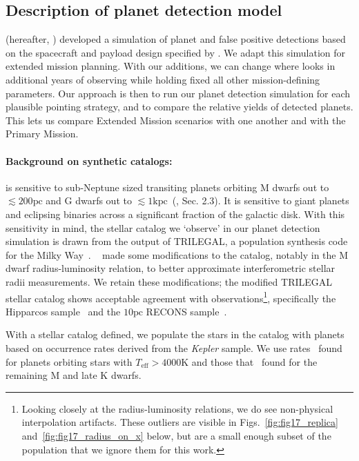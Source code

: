\subsection{Description of planet detection model}
\label{sec:planet_detection_model}

\citet{Sullivan_2015} (hereafter, )
developed a simulation of \tesss planet and false positive detections
based on the spacecraft and payload design specified by
\citet{ricker_transiting_2014}.  We adapt this simulation for extended
mission planning.  With our additions, we can change where \tess looks
in additional years of observing while holding fixed all other
mission-defining parameters.  Our approach is then to run our planet
detection simulation for each plausible pointing strategy, and to
compare the relative yields of detected planets.  This lets us compare
Extended Mission scenarios with one another and with the Primary
Mission.

\paragraph{Background on synthetic catalogs:}

\tess is sensitive to sub-Neptune sized transiting planets orbiting M
dwarfs out to $\lesssim200\text{pc}$ and G dwarfs out to
$\lesssim1\text{kpc}$~(, Sec. 2.3).  It is
sensitive to giant planets and eclipsing binaries across a significant
fraction of the galactic disk.  With this sensitivity in mind, the
stellar catalog we `observe' in our planet detection simulation is
drawn from the output of TRILEGAL, a population synthesis code for the
Milky Way~\citep{girardi_star_2005}.  ~ made
some modifications to the catalog, notably in the M dwarf
radius-luminosity relation, to better approximate interferometric
stellar radii measurements.  We retain these modifications; the modified
TRILEGAL stellar catalog shows acceptable agreement with
observations\footnote{Looking closely at the radius-luminosity
  relations, we do see non-physical interpolation artifacts. These
  outliers are visible in Figs.~\ref{fig:fig17_replica}
  and~\ref{fig:fig17_radius_on_x} below, but are a small enough subset
  of the population that we ignore them for this work.}, specifically
the Hipparcos
sample~\citep{perryman_hipparcos_1997,van_leeuwen_validation_2007} and
the $10\text{pc}$ RECONS sample~\citep{henry_solar_2006}.

With a stellar catalog defined, we populate the stars in the catalog
with planets based on occurrence rates derived from the
\textit{Kepler} sample.  We use rates~\citet{fressin_false_2013} found
for planets orbiting stars with $T_\text{eff} > 4000\text{K}$ and
those that~\citet{dressing_occurrence_2015} found for the remaining M
and late K dwarfs.

